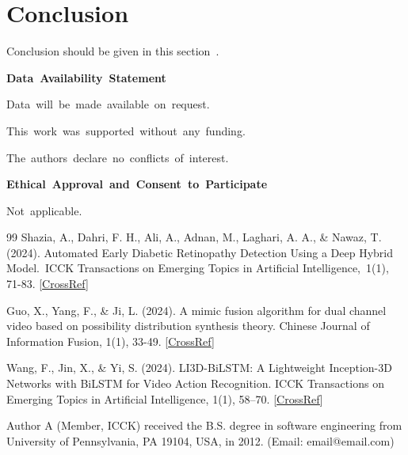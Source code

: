 \documentclass[twocolumn]{ICCKjournal} %
\begin{document}
\section{Conclusion}
Conclusion should be given in this section~\cite{2}.
\lipsum[1]

\par
\vspace{10pt}
{\large\textbf{Data Availability Statement}}

Data will be made available on request.

\acknowledgement
This work was supported without any funding.

\conflictsofinterest
The authors declare no conflicts of interest. 

\vspace{10pt}

{\large\textbf{Ethical Approval and Consent to Participate}} 

Not applicable.

%

\begin{fullwidth}
\begin{thebibliography}{99}
 Shazia, A., Dahri, F. H., Ali, A., Adnan, M., Laghari, A. A., \& Nawaz, T. (2024). Automated Early Diabetic Retinopathy Detection Using a Deep Hybrid Model. ICCK Transactions on Emerging Topics in Artificial Intelligence, 1(1), 71-83. [\href{https://doi.org/10.62762/TETAI.2024.305743}{CrossRef}]

 Guo, X., Yang, F., \& Ji, L. (2024). A mimic fusion algorithm for dual channel video based on possibility distribution synthesis theory. Chinese Journal of Information Fusion, 1(1), 33-49. [\href{https://doi.org/10.62762/CJIF.2024.361886}{CrossRef}]

 Wang, F., Jin, X., \& Yi, S. (2024). LI3D-BiLSTM: A Lightweight Inception-3D Networks with BiLSTM for Video Action Recognition. ICCK Transactions on Emerging Topics in Artificial Intelligence, 1(1), 58–70. [\href{https://doi.org/10.62762/TETAI.2024.628205}{CrossRef}]

\end{thebibliography}
\end{fullwidth}

\makeatletter
\if@twocolumn

  \begin{biography}[author1]{Author A} (Member, ICCK) received the B.S. degree in software engineering from University of Pennsylvania, PA 19104, USA, in 2012. (Email: email@email.com)
  \end{biography}
\end{document}
